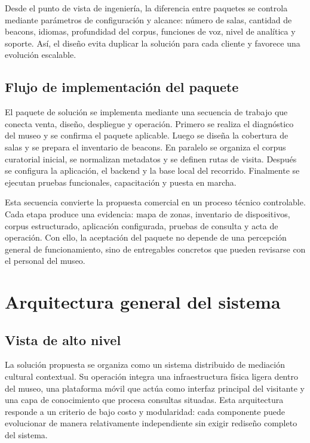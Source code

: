 Desde el punto de vista de ingeniería, la diferencia entre paquetes se controla mediante parámetros de configuración y alcance: número de salas, cantidad de beacons, idiomas, profundidad del corpus, funciones de voz, nivel de analítica y soporte. Así, el diseño evita duplicar la solución para cada cliente y favorece una evolución escalable.

\subsection{Flujo de implementación del paquete}

El paquete de solución se implementa mediante una secuencia de trabajo que conecta venta, diseño, despliegue y operación. Primero se realiza el diagnóstico del museo y se confirma el paquete aplicable. Luego se diseña la cobertura de salas y se prepara el inventario de beacons. En paralelo se organiza el corpus curatorial inicial, se normalizan metadatos y se definen rutas de visita. Después se configura la aplicación, el backend y la base local del recorrido. Finalmente se ejecutan pruebas funcionales, capacitación y puesta en marcha.

Esta secuencia convierte la propuesta comercial en un proceso técnico controlable. Cada etapa produce una evidencia: mapa de zonas, inventario de dispositivos, corpus estructurado, aplicación configurada, pruebas de consulta y acta de operación. Con ello, la aceptación del paquete no depende de una percepción general de funcionamiento, sino de entregables concretos que pueden revisarse con el personal del museo.

\section{Arquitectura general del sistema}

\subsection{Vista de alto nivel}

La solución propuesta se organiza como un sistema distribuido de mediación cultural contextual. Su operación integra una infraestructura física ligera dentro del museo, una plataforma móvil que actúa como interfaz principal del visitante y una capa de conocimiento que procesa consultas situadas. Esta arquitectura responde a un criterio de bajo costo y modularidad: cada componente puede evolucionar de manera relativamente independiente sin exigir rediseño completo del sistema.

